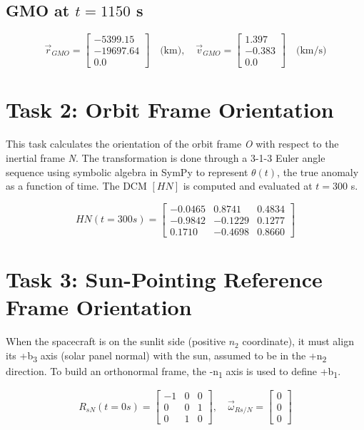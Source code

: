 \documentclass[conf]{new-aiaa}
\begin{document}
\subsection*{GMO at $t = 1150$ s}
\[
\vec{r}_{GMO} = 
\begin{bmatrix}
-5399.15 \\ -19697.64 \\ 0.0
\end{bmatrix} \quad \text{(km)}, \quad
\vec{v}_{GMO} = 
\begin{bmatrix}
1.397 \\ -0.383 \\ 0.0
\end{bmatrix} \quad \text{(km/s)}
\]

\section{Task 2: Orbit Frame Orientation}
This task calculates the orientation of the orbit frame \textit{O} with respect to the inertial frame \textit{N}. The transformation is done through a 3-1-3 Euler angle sequence using symbolic algebra in SymPy to represent $\theta(t)$, the true anomaly as a function of time. The DCM $[HN]$ is computed and evaluated at $t = 300$ s.

\[
HN(t = 300s) = 
\begin{bmatrix}
-0.0465 & 0.8741 & 0.4834 \\
-0.9842 & -0.1229 & 0.1277 \\
0.1710 & -0.4698 & 0.8660
\end{bmatrix}
\]

\section{Task 3: Sun-Pointing Reference Frame Orientation}
When the spacecraft is on the sunlit side (positive $n_2$ coordinate), it must align its +b\textsubscript{3} axis (solar panel normal) with the sun, assumed to be in the +n\textsubscript{2} direction. To build an orthonormal frame, the -n\textsubscript{1} axis is used to define +b\textsubscript{1}.

\[
R_{sN}(t = 0s) = 
\begin{bmatrix}
-1 & 0 & 0 \\
0 & 0 & 1 \\
0 & 1 & 0
\end{bmatrix}, \quad
\vec{\omega}_{Rs/N} = 
\begin{bmatrix}
0 \\ 0 \\ 0
\end{bmatrix}
\]
\end{document}
